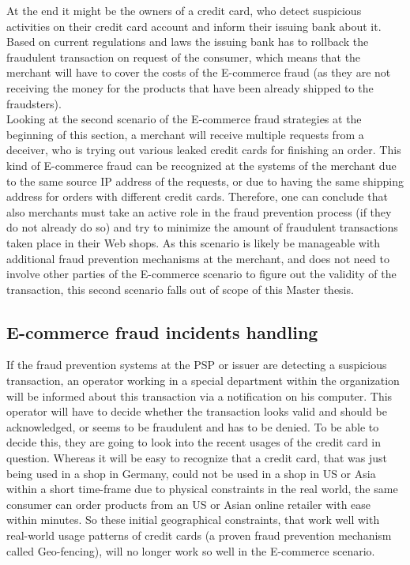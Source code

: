 At the end it might be the owners of a credit card, who detect suspicious activities on their credit card account and inform their issuing bank about it. Based on current regulations and laws the issuing bank has to rollback the fraudulent transaction on request of the consumer, which means that the merchant will have to cover the costs of the \gls{E-commerce} fraud (as they are not receiving the money for the products that have been already shipped to the fraudsters). \\

Looking at the second scenario of the \gls{E-commerce} fraud strategies at the beginning of this section, a merchant will receive multiple requests from a deceiver, who is trying out various leaked credit cards for finishing an order. This kind of \gls{E-commerce} fraud can be recognized at the systems of the merchant due to the same source \gls{IP} address of the requests, or due to having the same shipping address for orders with different credit cards. Therefore, one can conclude that also merchants must take an active role in the fraud prevention process (if they do not already do so) and try to minimize the amount of fraudulent transactions taken place in their Web shops. As this scenario is likely be manageable with additional fraud prevention mechanisms at the merchant, and does not need to involve other parties of the \gls{E-commerce} scenario to figure out the validity of the transaction, this second scenario falls out of scope of this Master thesis.


\subsection{E-commerce fraud incidents handling}
\label{subsec:e_commerce_fraud_handling}

If the fraud prevention systems at the \gls{PSP} or issuer are detecting a suspicious transaction, an operator working in a special department within the organization will be informed about this transaction via a notification on his computer. This operator will have to decide whether the transaction looks valid and should be acknowledged, or seems to be fraudulent and has to be denied. To be able to decide this, they are going to look into the recent usages of the credit card in question. Whereas it will be easy to recognize that a credit card, that was just being used in a shop in Germany, could not be used in a shop in US or Asia within a short time-frame due to physical constraints in the real world, the same consumer can order products from an US or Asian online retailer with ease within minutes. So these initial geographical constraints, that work well with real-world usage patterns of credit cards (a proven fraud prevention mechanism called Geo-fencing), will no longer work so well in the \gls{E-commerce} scenario. \\

